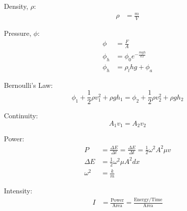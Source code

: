 \documentclass[10pt, letterpaper]{book}
\begin{document}
\begin{multicols*}{2}
        Density, $\rho$:
        \begin{align}
            \rho    & = \frac{m}{V}                             
        \end{align}

        Pressure, $\phi$:
        \begin{align}
            \phi    & = \frac{F}{A}                             \\
            \phi_{h}& = \phi_{0}e^{-\frac{mgh}{kT}}             \\
            \phi_{h}& = \rho_{l}hg + \phi_{a}
        \end{align}

        Bernoulli's Law:
        \begin{equation}
            \phi_{1} + \frac{1}{2}\rho v_{1}^{2} + \rho gh_{1} = 
            \phi_{2} + \frac{1}{2}\rho v_{2}^{2} + \rho gh_{2}
        \end{equation}

        Continuity:
        \begin{equation}
            A_{1}v_{1} = A_{2}v_{2}
        \end{equation}

        Power:
        \begin{align}
            P   & = \frac{\Delta E}{\Delta t}
                = \frac{\Delta E}{\Delta t} 
                = \frac{1}{2}\omega^{2}A^{2}\mu v           \\
            \Delta E & =\frac{1}{2}\omega^{2}\mu A^{2}dx    \\
            \omega^{2} & = \frac{k}{m}                      
        \end{align}

        Intensity:
        \begin{align}
            I   & = \frac{\text{Power}}{\text{Area}}
                  = \frac{\text{Energy}/\text{Time}}{\text{Area}}
        \end{align}

    \end{multicols*}

    \pagebreak
\end{document}
